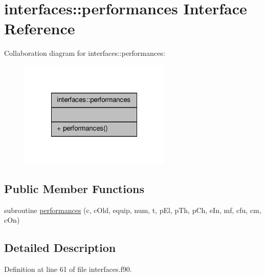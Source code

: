 \hypertarget{interfaceinterfaces_1_1performances}{\section{interfaces\-:\-:performances Interface Reference}
\label{interfaceinterfaces_1_1performances}
}


Collaboration diagram for interfaces\-:\-:performances\-:\nopagebreak
\begin{figure}[H]
\begin{center}
\leavevmode
\includegraphics[width=204pt]{interfaceinterfaces_1_1performances__coll__graph}
\end{center}
\end{figure}
\subsection*{Public Member Functions}
\begin{DoxyCompactItemize}
\item 
subroutine \hyperlink{interfaceinterfaces_1_1performances_a974c64e6d2f0a16c66c24bf3799de6f6}{performances} (c, c\-Old, equip, num, t, p\-El, p\-Th, p\-Ch, e\-In, mf, cfu, cm, c\-On)
\end{DoxyCompactItemize}


\subsection{Detailed Description}


Definition at line 61 of file interfaces.\-f90.



